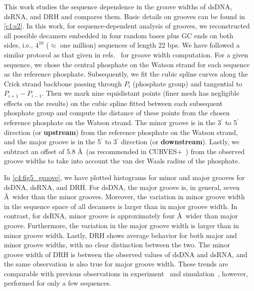 This work studies the sequence dependence in the groove widths of dsDNA, dsRNA, and DRH and compares them.
Basic details on grooves can be found in \cref{c1:s2}.
In this work, for sequence-dependent analysis of grooves, we reconstructed all possible decamers embedded in four random bases plus GC ends on both sides, i.e., $4^{10}$ ($\approx$ one million)  sequences of length 22 bps. 
We have followed a similar protocol as that given in refs.~\cite{curveplus,stofer1994measuring} for groove width computation.
For a given sequence, we chose the central phosphate on the Watson strand for each sequence as the reference phosphate.
Subsequently, we fit the cubic spline curves along the Crick strand backbone passing through $P_i$ (phosphate group) and tangential to $P_{i+1}-P_{i-1}$.   
Then we mark nine equidistant points (finer mesh has negligible effects on the results) on the cubic spline fitted between each subsequent phosphate group and compute the distance of these points from the chosen reference phosphate on the Watson strand. 
The minor groove is in the 3$^\prime$ to 5$^\prime$ direction (or \textbf{upstream}) from the reference phosphate on the Watson strand, and the major groove is in the 5$^\prime$ to 3$^\prime$ direction (or \textbf{downstream}).
Lastly, we subtract an offset of 5.8 \AA \ (as recommended in CURVES$+$~\cite{curveplus}) from the observed groove widths to take into account the van der Waals radius of the phosphate.


In \cref{c4:fig5_groove}, we have plotted histograms for minor and major grooves for dsDNA, dsRNA, and DRH. 
For dsDNA, the major groove is, in general, seven \AA \  wider than the minor grooves. 
Moreover, the variation in minor groove width in the sequence space of all decamers is larger than in major groove width.
In contrast, for dsRNA, minor groove is approximately four \AA \ wider than major groove.
Furthermore, the variation in the major groove width
is larger than in minor groove width.
Lastly, DRH shows average behavior for both major and minor groove widths, with no clear distinction between the two. 
The minor groove width of DRH is between the observed values of dsDNA and dsRNA, and the same observation is also true for major groove width. 
These trends are comparable with previous observations in experiment~\cite{oguey2010understanding,rohs2009role} and simulation~\cite{marin2020double,cheatham1997molecular,noy2005structure}, however, performed for only a few sequences.

